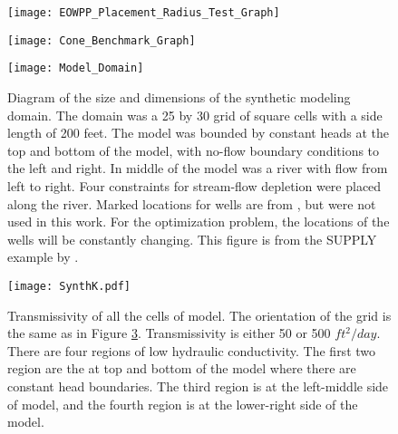 \documentclass[authoryear]{elsarticle}
\begin{document}
\begin{figure}
\centering
\texttt{[image: EOWPP\_Placement\_Radius\_Test\_Graph]}
\caption{}
\label{fig:PlacementRadiusGraph}
\end{figure}

\begin{figure}
\centering
\texttt{[image: Cone\_Benchmark\_Graph]}
\caption{}
\label{fig:ConeBenchmarkGraph}
\end{figure}

\begin{figure}
\centering
\texttt{[image: Model\_Domain]}
\caption{Diagram of the size and dimensions of the synthetic modeling domain. The domain was a 25 by 30 grid of square cells with a side length of 200 feet. The model was bounded by constant heads at the top and bottom of the model, with no-flow boundary conditions to the left and right. In middle of the model was a river with flow from left to right. Four constraints for stream-flow depletion were placed along the river. Marked locations for wells are from \citet{ahlfeld2005gwm}, but were not used in this work. For the optimization problem, the locations of the wells will be constantly changing. This figure is from the SUPPLY example by \cite{ahlfeld2005gwm}.}
\label{fig:Model_Domain}
\end{figure}

\begin{figure}
\centering
\texttt{[image: SynthK.pdf]}
\caption{Transmissivity of all the cells of model. The orientation of the grid is the same as in Figure \ref{fig:Model_Domain}. Transmissivity is either 50 or 500 $ft^2/day$. There are four regions of low hydraulic conductivity. The first two region are the at top and bottom of the model where there are constant head boundaries. The third region is at the left-middle side of model, and the fourth region is at the lower-right side of the model.}
\label{fig:TRAN_color}
\end{figure}
\end{document}
